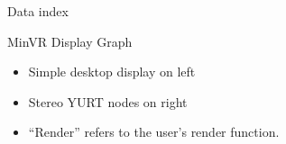 \documentclass[12pt]{article}
\begin{document}
Data index

\begin{frame}{MinVR Display Graph}

\begin{center}
\begin{minipage}[c]{0.3\columnwidth}
\begin{itemize}\raggedright
\item Simple desktop display on left

\item Stereo YURT nodes on right

\item ``Render'' refers to the user's render function.
\end{itemize}
\end{minipage}\hspace{15pt}
\begin{minipage}{0.51\columnwidth}
\end{minipage}
\end{center}
\end{frame}
\end{document}
